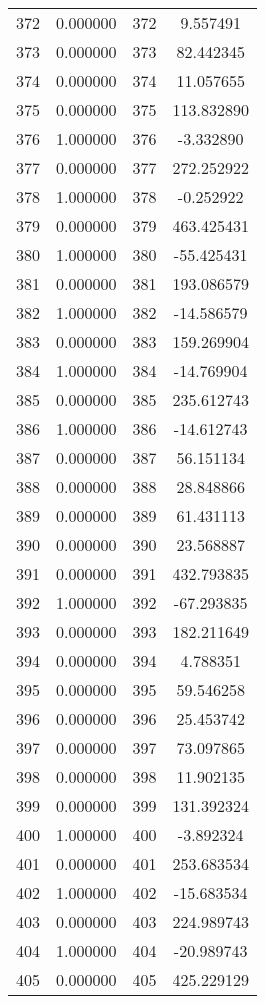 \documentclass[12pt]{article}
\begin{document}
\begin{longtable}{@{}cccc@{}}
372 & 0.000000 & 372 & 9.557491 \\
373 & 0.000000 & 373 & 82.442345 \\
374 & 0.000000 & 374 & 11.057655 \\
375 & 0.000000 & 375 & 113.832890 \\
376 & 1.000000 & 376 & -3.332890 \\
377 & 0.000000 & 377 & 272.252922 \\
378 & 1.000000 & 378 & -0.252922 \\
379 & 0.000000 & 379 & 463.425431 \\
380 & 1.000000 & 380 & -55.425431 \\
381 & 0.000000 & 381 & 193.086579 \\
382 & 1.000000 & 382 & -14.586579 \\
383 & 0.000000 & 383 & 159.269904 \\
384 & 1.000000 & 384 & -14.769904 \\
385 & 0.000000 & 385 & 235.612743 \\
386 & 1.000000 & 386 & -14.612743 \\
387 & 0.000000 & 387 & 56.151134 \\
388 & 0.000000 & 388 & 28.848866 \\
389 & 0.000000 & 389 & 61.431113 \\
390 & 0.000000 & 390 & 23.568887 \\
391 & 0.000000 & 391 & 432.793835 \\
392 & 1.000000 & 392 & -67.293835 \\
393 & 0.000000 & 393 & 182.211649 \\
394 & 0.000000 & 394 & 4.788351 \\
395 & 0.000000 & 395 & 59.546258 \\
396 & 0.000000 & 396 & 25.453742 \\
397 & 0.000000 & 397 & 73.097865 \\
398 & 0.000000 & 398 & 11.902135 \\
399 & 0.000000 & 399 & 131.392324 \\
400 & 1.000000 & 400 & -3.892324 \\
401 & 0.000000 & 401 & 253.683534 \\
402 & 1.000000 & 402 & -15.683534 \\
403 & 0.000000 & 403 & 224.989743 \\
404 & 1.000000 & 404 & -20.989743 \\
405 & 0.000000 & 405 & 425.229129 \\

\end{longtable}
\end{document}
